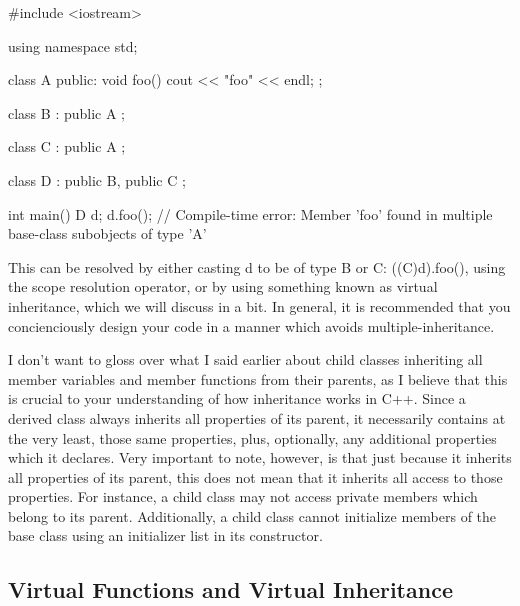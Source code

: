 \documentclass{article}
\begin{document}
\begin{cpplst}

#include <iostream>

using namespace std;

class A
{
public:
    void foo()
    {
        cout << "foo" << endl;
    }
};

class B : public A
{};

class C : public A
{};

class D : public B, public C
{};

int main()
{
    D d;
    d.foo(); // Compile-time error: Member 'foo' found in multiple base-class subobjects of type 'A'
}

\end{cpplst}

This can be resolved by either casting d to be of type B or C: ((C)d).foo(), using the scope resolution
operator, or by using something known as virtual inheritance, which we will discuss in a bit. In general, it
is recommended that you concienciously design your code in a manner which avoids multiple-inheritance.

I don't want to gloss over what I said earlier about child classes inheriting all member variables and member
functions from their parents, as I believe that this is crucial to your understanding of how inheritance works
in C++. Since a derived class always inherits all properties of its parent, it necessarily contains at the
very least, those same properties, plus, optionally, any additional properties which it declares. Very important
to note, however, is that just because it inherits all properties of its parent, this does not mean that it
inherits all access to those properties. For instance, a child class may not access private members which belong
to its parent. Additionally, a child class cannot initialize members of the base class using an initializer list
in its constructor.

\subsection{Virtual Functions and Virtual Inheritance}
\end{document}
